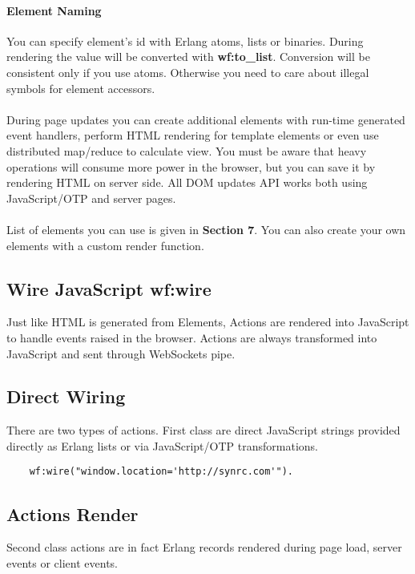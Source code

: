 \paragraph{\bf Element Naming}
You can specify element's id with Erlang atoms,
lists or binaries. During rendering the value will be converted
with {\bf wf:to\_list}. Conversion will be consistent only if you use atoms.
Otherwise you need to care about illegal symbols for element accessors.

\paragraph{}
During page updates you can create additional elements with
run-time generated event handlers, perform HTML rendering for
template elements or even use distributed map/reduce to calculate view.
You must be aware that heavy operations will consume
more power in the browser, but you can save it by rendering
HTML on server side. All DOM updates API works both using
JavaScript/OTP and server pages.

\paragraph{}
List of elements you can use is given in {\bf Section 7}. You can also create
your own elements with a custom render function.

\subsection{Wire JavaScript \bf{wf:wire}}
Just like HTML is generated from Elements, Actions are rendered into
JavaScript to handle events raised in the browser. Actions are always
transformed into JavaScript and sent through WebSockets pipe.

\subsection*{Direct Wiring}
There are two types of actions. First class are direct JavaScript
strings provided directly as Erlang lists or via JavaScript/OTP
transformations.

\vspace{1\baselineskip}
\begin{lstlisting}
    wf:wire("window.location='http://synrc.com'").
\end{lstlisting}

\subsection*{Actions Render}
Second class actions are in fact Erlang records
rendered during page load, server events or client events.

